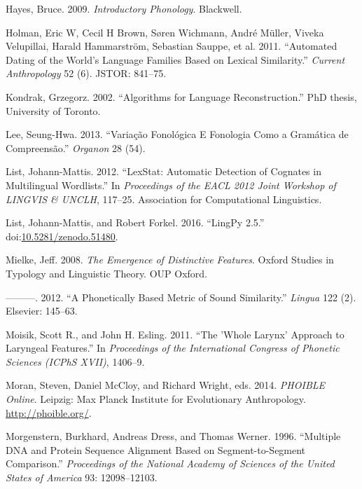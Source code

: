\documentclass[a4paper]{article}
\begin{document}
\begin{thebibliography}{99}
Hayes, Bruce. 2009. \emph{Introductory Phonology}. Blackwell.

Holman, Eric W, Cecil H Brown, Søren Wichmann, Andr{\'e} M{\"u}ller, Viveka
Velupillai, Harald Hammarström, Sebastian Sauppe, et al. 2011.
``Automated Dating of the World's Language Families Based on Lexical
Similarity.'' \emph{Current Anthropology} 52 (6). JSTOR: 841--75.

Kondrak, Grzegorz. 2002. ``Algorithms for Language Reconstruction.''
PhD thesis, University of Toronto.

Lee, Seung-Hwa. 2013. ``Varia{\c c}{\~a}o Fonol{\'o}gica E Fonologia Como a Gram{\'a}tica
de Compreens{\~a}o.'' \emph{Organon} 28 (54).

List, Johann-Mattis. 2012. ``LexStat: Automatic Detection of Cognates in
Multilingual Wordlists.'' In \emph{Proceedings of the EACL 2012 Joint
Workshop of LINGVIS \& UNCLH}, 117--25. Association for Computational
Linguistics.

List, Johann-Mattis, and Robert Forkel. 2016. ``LingPy 2.5.''
doi:\href{https://doi.org/10.5281/zenodo.51480}{10.5281/zenodo.51480}.

Mielke, Jeff. 2008. \emph{The Emergence of Distinctive Features}. Oxford
Studies in Typology and Linguistic Theory. OUP Oxford.

---------. 2012. ``A Phonetically Based Metric of Sound Similarity.''
\emph{Lingua} 122 (2). Elsevier: 145--63.

Moisik, Scott R., and John H. Esling. 2011. ``The 'Whole Larynx'
Approach to Laryngeal Features.'' In \emph{Proceedings of the
International Congress of Phonetic Sciences (ICPhS XVII)}, 1406--9.

Moran, Steven, Daniel McCloy, and Richard Wright, eds. 2014.
\emph{PHOIBLE Online}. Leipzig: Max Planck Institute for Evolutionary
Anthropology. \url{http://phoible.org/}.

Morgenstern, Burkhard, Andreas Dress, and Thomas Werner. 1996.
``Multiple DNA and Protein Sequence Alignment Based on
Segment-to-Segment Comparison.'' \emph{Proceedings of the National
Academy of Sciences of the United States of America} 93: 12098--12103.


\end{thebibliography}
\end{document}
